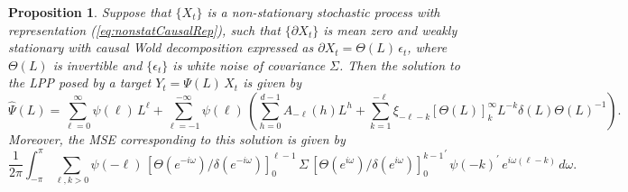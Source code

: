 \documentclass[a4paper]{book}
\newtheorem{Proposition}{Proposition}
\begin{document}
\begin{Proposition}
 \label{prop:GPP-nonstat}
 Suppose that $\{ X_t \}$ is  a non-stationary stochastic process
 with representation (\ref{eq:nonstatCausalRep}), such that
 $\{ \partial X_t \}$ is mean zero and weakly stationary 
 with  causal Wold decomposition expressed as $\partial X_t = \Theta (L) \, \epsilon_t$,
 where $\Theta (L)$ is invertible and
  $\{ \epsilon_t \}$ is white noise of covariance $\Sigma$.
  Then the solution
 to the LPP posed by a   target $Y_t = \Psi (L) \, X_t$ is given by
\begin{equation}
 \label{eq:GPPsoln-nonstat}
  \widehat{\Psi} (L) = \sum_{\ell = 0}^{\infty} \psi (\ell) \, L^{\ell}
    + \sum_{ \ell = -1}^{- \infty} \psi (\ell) \, 
\left(  \sum_{h=0 }^{d-1} A_{-\ell} (h) L^{h} + \sum_{k=1}^{-\ell} \xi_{-\ell-k}
  { [  \Theta (L) ] }_{k}^{\infty} L^{-k} \delta (L) { \Theta (L)}^{-1} 
 \right).
\end{equation}
 Moreover, the   MSE  corresponding to this solution is given by
\begin{equation} 
\label{eq:minimalMSE}
 \frac{1}{ 2 \pi} \int_{-\pi}^{\pi}   \sum_{\ell, k > 0 } \psi (-\ell) \,
  {[ \Theta  (e^{-i \omega}) / \delta (e^{-i \omega}) ]}_0^{\ell-1}   \,  \Sigma \,
  { {[ \Theta  (e^{i \omega}) / \delta (e^{i \omega}) ]}_0^{ k-1} }^{\prime}  \,
   {\psi (-k) }^{\prime} \,  e^{i \omega (\ell - k) }   \, d\omega.
\end{equation}
 \end{Proposition}
 
\end{document}
